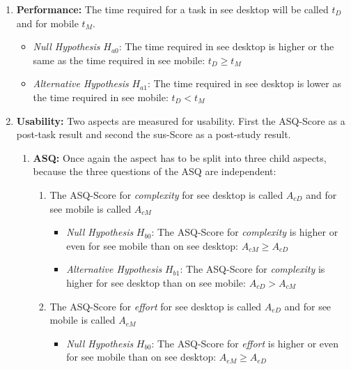 \begin{enumerate}[{label=\alph*)}]
  \item \textbf{Performance:} The time required for a task in \gls{see} desktop will be called $t_D$ and for mobile $t_M$.
        \begin{itemize}
          \item \textit{Null Hypothesis} $H_{a0}$: The time required in \gls{see} desktop is higher or the same as the time required in \gls{see} mobile: $t_D \geq t_M$
          \item \textit{Alternative Hypothesis} $H_{a1}$: The time required in {\gls{see}} desktop is lower as the time required in \gls{see} mobile: $t_D < t_M$
        \end{itemize}
  \item \textbf{Usability:} Two aspects are measured for \gls{usability}. First the \gls{ASQ}-Score as a \gls{post-task} result and second the \gls{sus}-Score as a \gls{post-study} result.
        \begin{enumerate}[label=\roman*)]
          \item \textbf{ASQ:} Once again the aspect has to be split into three child aspects, because the three questions of the \gls{ASQ} are independent:
                \begin{enumerate}[{label=\arabic*)}]
                  \item The \gls{ASQ}-Score for \textit{complexity} for \gls{see} desktop is called $A_{cD}$ and for \gls{see} mobile is called $A_{cM}$
                        \begin{itemize}
                          \item \textit{Null Hypothesis} $H_{b0}$: The \gls{ASQ}-Score for \textit{complexity} is higher or even for \gls{see} mobile than on \gls{see} desktop: $A_{cM} \geq A_{cD}$
                          \item \textit{Alternative Hypothesis} $H_{b1}$: The \gls{ASQ}-Score for \textit{complexity} is higher for \gls{see} desktop than on \gls{see} mobile: $A_{cD} > A_{cM}$
                        \end{itemize}
                  \item The \gls{ASQ}-Score for \textit{effort} for \gls{see} desktop is called $A_{eD}$ and for \gls{see} mobile is called $A_{eM}$
                        \begin{itemize}
                          \item \textit{Null Hypothesis} $H_{b0}$: The \gls{ASQ}-Score for \textit{effort} is higher or even for \gls{see} mobile than on \gls{see} desktop: $A_{eM} \geq A_{eD}$

\end{itemize}
\end{enumerate}
\end{enumerate}
\end{enumerate}
